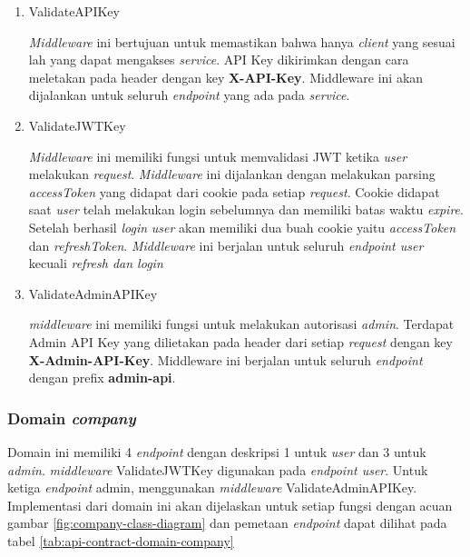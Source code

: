 \begin{enumerate}
  \item ValidateAPIKey

        \textit{Middleware} ini bertujuan untuk memastikan bahwa hanya \textit{client} yang sesuai lah yang dapat mengakses \textit{service}. API Key dikirimkan dengan cara meletakan pada header dengan key \textbf{X-API-Key}. Middleware ini akan dijalankan untuk seluruh \textit{endpoint} yang ada pada \textit{service}.

  \item ValidateJWTKey

        \textit{Middleware} ini memiliki fungsi untuk memvalidasi JWT ketika \textit{user} melakukan \textit{request}. \textit{Middleware} ini dijalankan dengan melakukan parsing \textit{accessToken} yang didapat dari cookie pada setiap \textit{request}. Cookie didapat saat \textit{user} telah melakukan login sebelumnya dan memiliki batas waktu \textit{expire}. Setelah berhasil \textit{login} \textit{user} akan memiliki dua buah cookie yaitu \textit{accessToken} dan \textit{refreshToken}.  \textit{Middleware} ini berjalan untuk seluruh \textit{endpoint user} kecuali \textit{refresh dan login}


  \item ValidateAdminAPIKey

        \textit{middleware} ini memiliki fungsi untuk melakukan autorisasi \textit{admin}. Terdapat Admin API Key yang dilietakan pada header dari setiap \textit{request} dengan key \textbf{X-Admin-API-Key}. Middleware ini berjalan untuk seluruh \textit{endpoint} dengan prefix \textbf{admin-api}.
\end{enumerate}


\subsubsection{Domain \textit{company}}

Domain ini memiliki 4 \textit{endpoint} dengan deskripsi 1 untuk \textit{user} dan 3 untuk \textit{admin}. \textit{middleware} ValidateJWTKey digunakan pada \textit{endpoint user}. Untuk ketiga \textit{endpoint} admin, menggunakan \textit{middleware} ValidateAdminAPIKey. Implementasi dari domain ini akan dijelaskan untuk setiap fungsi dengan acuan gambar \ref{fig:company-class-diagram} dan pemetaan \textit{endpoint} dapat dilihat pada tabel \ref{tab:api-contract-domain-company}


